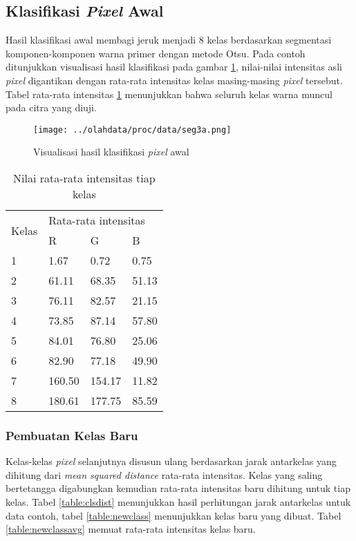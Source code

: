 \documentclass[laporan.tex]{subfiles}
\begin{document}
\subsection{Klasifikasi \emph{Pixel} Awal}

Hasil klasifikasi awal membagi jeruk menjadi 8 kelas berdasarkan segmentasi komponen-komponen warna primer dengan metode Otsu. Pada contoh ditunjukkan visualisasi hasil klasifikasi pada gambar \ref{fig:classinit}, nilai-nilai intensitas asli \emph{pixel} digantikan dengan rata-rata intensitas kelas masing-masing \emph{pixel} tersebut. Tabel rata-rata intensitas \ref{table:clsrgbavg1} menunjukkan bahwa seluruh kelas warna muncul pada citra yang diuji.

\begin{figure}[h]
\centering
\texttt{[image: ../olahdata/proc/data/seg3a.png]}
\caption{Visualisasi hasil klasifikasi \emph{pixel} awal}
\label{fig:classinit}
\end{figure}

\begin{table}[h]
\centering
\begin{tabular}{|l|l|l|l|}
\cline{1-4}
\multirow{2}{*}{Kelas} & \multicolumn{3}{l|}{Rata-rata intensitas} \\
\cline{2-4}
 & R & G & B \\
\cline{1-4}
1 & 1.67 & 0.72 & 0.75 \\
2 & 61.11 & 68.35 & 51.13 \\
3 & 76.11 & 82.57 & 21.15 \\
4 & 73.85 & 87.14 & 57.80 \\
5 & 84.01 & 76.80 & 25.06 \\
6 & 82.90 & 77.18 & 49.90 \\
7 & 160.50 & 154.17 & 11.82 \\
8 & 180.61 & 177.75 & 85.59 \\
\cline{1-4}
\end{tabular}
\caption{Nilai rata-rata intensitas tiap kelas}
\label{table:clsrgbavg1}
\end{table}

\subsubsection{Pembuatan Kelas Baru}

Kelas-kelas \emph{pixel} selanjutnya disusun ulang berdasarkan jarak antarkelas yang dihitung dari \emph{mean squared distance} rata-rata intensitas. Kelas yang saling bertetangga digabungkan kemudian rata-rata intensitas baru dihitung untuk tiap kelas. Tabel \ref{table:clsdist} menunjukkan hasil perhitungan jarak antarkelas untuk data contoh, tabel \ref{table:newclass} menunjukkan kelas baru yang dibuat. Tabel \ref{table:newclassavg} memuat rata-rata intensitas kelas baru.
\end{document}
